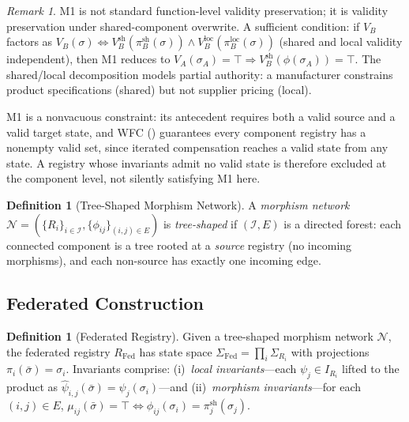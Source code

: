 \documentclass[11pt,a4paper]{article}
\theoremstyle{plain}
\theoremstyle{definition}
\newtheorem{definition}[theorem]{Definition}
\theoremstyle{remark}
\newtheorem{remark}[theorem]{Remark}
\newcommand{\Fed}{\mathrm{Fed}}
\renewcommand{\_}{\textunderscore\allowbreak}
\begin{document}
\begin{remark}
M1 is not standard function-level validity preservation; it is validity
preservation under shared-component overwrite.  A sufficient condition: if
$V_B$ factors as
$V_B(\sigma) \iff V_B^{\mathrm{sh}}(\pi_B^{\mathrm{sh}}(\sigma)) \wedge
V_B^{\mathrm{loc}}(\pi_B^{\mathrm{loc}}(\sigma))$ (shared and local validity
independent), then M1 reduces to
$V_A(\sigma_A) = \top \Rightarrow
V_B^{\mathrm{sh}}(\phi(\sigma_A)) = \top$.
The shared/local decomposition models partial authority: a manufacturer
constrains product specifications (shared) but not supplier pricing (local).

M1 is a nonvacuous constraint: its antecedent requires both a valid source
and a valid target state, and WFC () guarantees every component
registry has a nonempty valid set, since iterated compensation reaches a valid
state from any state. A registry whose invariants admit no valid state is
therefore excluded at the component level, not silently satisfying M1 here.
\end{remark}

\begin{definition}[Tree-Shaped Morphism Network]
\label{def:network}
A \emph{morphism network} $\mathcal{N} = (\{R_i\}_{i \in \mathcal{I}},
\{\phi_{ij}\}_{(i,j) \in E})$ is \emph{tree-shaped} if $(\mathcal{I}, E)$ is
a directed forest: each connected component is a tree rooted at a
\emph{source} registry (no incoming morphisms), and each non-source has
exactly one incoming edge.
\end{definition}

\subsection{Federated Construction}

\begin{definition}[Federated Registry]
\label{def:fed-registry}
Given a tree-shaped morphism network $\mathcal{N}$, the federated registry
$R_\Fed$ has state space $\Sigma_\Fed = \prod_i \Sigma_{R_i}$ with
projections $\pi_i(\bar{\sigma}) = \sigma_i$.  Invariants comprise:
(i)~\emph{local invariants}---each $\psi_j \in I_{R_i}$ lifted to the product
as $\hat{\psi}_{i,j}(\bar{\sigma}) = \psi_j(\sigma_i)$---and
(ii)~\emph{morphism invariants}---for each $(i,j) \in E$,
$\mu_{ij}(\bar{\sigma}) = \top \iff
\phi_{ij}(\sigma_i) = \pi_j^{\mathrm{sh}}(\sigma_j)$.
\end{definition}
\end{document}

